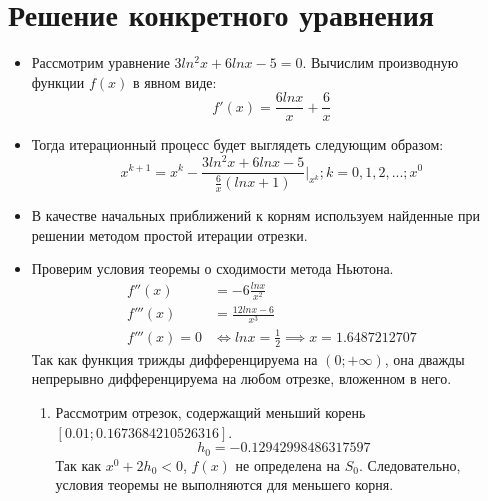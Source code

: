 \documentclass[14pt, a4paper]{article}
\begin{document}
  \section*{Решение конкретного уравнения}
  \begin{itemize}
    \item
    Рассмотрим уравнение $3ln^2x + 6lnx - 5 = 0$. Вычислим производную функции $f(x)$ в явном виде: \begin{equation}f'(x) = \frac{6lnx}{x} + \frac{6}{x}\end{equation}
    \item
    Тогда итерационный процесс будет выглядеть следующим образом: \begin{equation}x^{k + 1} = x^k - \frac{3ln^2x + 6lnx - 5}{\frac{6}{x}(lnx + 1)}\bigg|_{x^k}; k = 0, 1, 2, ...; x^0\end{equation}
    \item
    В качестве начальных приближений к корням используем найденные при решении методом простой итерации отрезки.
    \item
    Проверим условия теоремы о сходимости метода Ньютона.
    \begin{align*} f''(x) &= -6\frac{lnx}{x^2} \\ f'''(x) &= \frac{12lnx - 6}{x^3} \\ f'''(x) = 0 &\iff lnx = \frac{1}{2} \implies x = 1.6487212707\end{align*}
    Так как функция трижды дифференцируема на $(0; +\infty)$, она дважды непрерывно дифференцируема на любом отрезке, вложенном в него.
    \begin{enumerate}
    \item
    Рассмотрим отрезок, содержащий меньший корень $[0.01; 0.1673684210526316]$.
    \begin{equation*}h_0 = -0.12942998486317597\end{equation*}
    Так как $x^0 + 2h_0 < 0$, $f(x)$ не определена на $S_0$. Следовательно, условия теоремы не выполняются для меньшего корня.
    

\end{enumerate}
\end{itemize}
\end{document}
